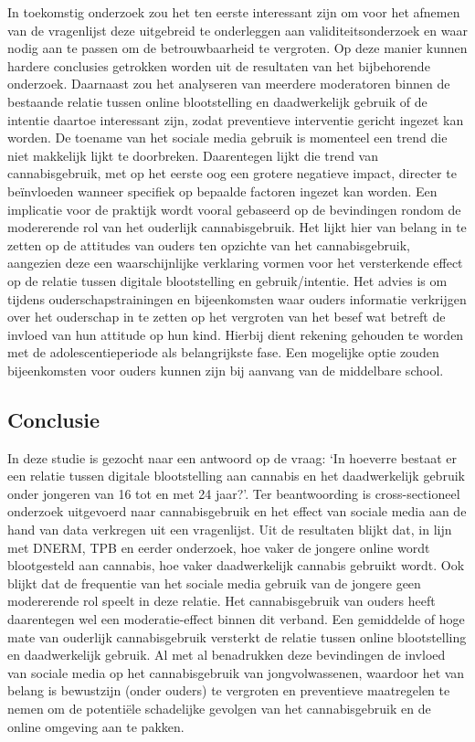 \documentclass[
  letterpaper,
  DIV=11,
  numbers=noendperiod]{scrartcl}
\begin{document}
In toekomstig onderzoek zou het ten eerste interessant zijn om voor het
afnemen van de vragenlijst deze uitgebreid te onderleggen aan
validiteitsonderzoek en waar nodig aan te passen om de betrouwbaarheid
te vergroten. Op deze manier kunnen hardere conclusies getrokken worden
uit de resultaten van het bijbehorende onderzoek. Daarnaast zou het
analyseren van meerdere moderatoren binnen de bestaande relatie tussen
online blootstelling en daadwerkelijk gebruik of de intentie daartoe
interessant zijn, zodat preventieve interventie gericht ingezet kan
worden. De toename van het sociale media gebruik is momenteel een trend
die niet makkelijk lijkt te doorbreken. Daarentegen lijkt die trend van
cannabisgebruik, met op het eerste oog een grotere negatieve impact,
directer te beïnvloeden wanneer specifiek op bepaalde factoren ingezet
kan worden. Een implicatie voor de praktijk wordt vooral gebaseerd op de
bevindingen rondom de modererende rol van het ouderlijk cannabisgebruik.
Het lijkt hier van belang in te zetten op de attitudes van ouders ten
opzichte van het cannabisgebruik, aangezien deze een waarschijnlijke
verklaring vormen voor het versterkende effect op de relatie tussen
digitale blootstelling en gebruik/intentie. Het advies is om tijdens
ouderschapstrainingen en bijeenkomsten waar ouders informatie verkrijgen
over het ouderschap in te zetten op het vergroten van het besef wat
betreft de invloed van hun attitude op hun kind. Hierbij dient rekening
gehouden te worden met de adolescentieperiode als belangrijkste fase.
Een mogelijke optie zouden bijeenkomsten voor ouders kunnen zijn bij
aanvang van de middelbare school.

\hypertarget{conclusie}{%
\subsection{Conclusie}\label{conclusie}}

In deze studie is gezocht naar een antwoord op de vraag: `In hoeverre
bestaat er een relatie tussen digitale blootstelling aan cannabis en het
daadwerkelijk gebruik onder jongeren van 16 tot en met 24 jaar?'. Ter
beantwoording is cross-sectioneel onderzoek uitgevoerd naar
cannabisgebruik en het effect van sociale media aan de hand van data
verkregen uit een vragenlijst. Uit de resultaten blijkt dat, in lijn met
DNERM, TPB en eerder onderzoek, hoe vaker de jongere online wordt
blootgesteld aan cannabis, hoe vaker daadwerkelijk cannabis gebruikt
wordt. Ook blijkt dat de frequentie van het sociale media gebruik van de
jongere geen modererende rol speelt in deze relatie. Het cannabisgebruik
van ouders heeft daarentegen wel een moderatie-effect binnen dit
verband. Een gemiddelde of hoge mate van ouderlijk cannabisgebruik
versterkt de relatie tussen online blootstelling en daadwerkelijk
gebruik. Al met al benadrukken deze bevindingen de invloed van sociale
media op het cannabisgebruik van jongvolwassenen, waardoor het van
belang is bewustzijn (onder ouders) te vergroten en preventieve
maatregelen te nemen om de potentiële schadelijke gevolgen van het
cannabisgebruik en de online omgeving aan te pakken.
\end{document}
